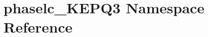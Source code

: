 \hypertarget{namespacephaselc__KEPQ3}{\section{phaselc\-\_\-\-K\-E\-P\-Q3 Namespace Reference}
\label{namespacephaselc__KEPQ3}
}
